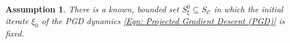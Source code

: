\documentclass[letterpaper, 10 pt, conference]{ieeeconf}
\newcommand{\?}{\stackrel{?}{=}}
\newcommand{\obj}{J}
\newcommand{\param}{\theta}
\newcommand{\paramSet}{\Theta}
\newcommand{\var}{\xi}
\newcommand{\varOpt}{\var^\star}
\newcommand{\varOptSet}{S_\var^\star}
\newcommand{\smoothnessConstant}{L}
\newcommand{\ratePGD}{\alpha}
\newcommand{\ratePGDMin}{c_\ratePGD}
\newcommand{\ratePGDMax}{C_\ratePGD}
\newcommand{\constraintSet}{{S_{\mathcal{C}}}}
\newcommand{\varInitialSet}{S_\var^0}
\newtheorem{assumption}{Assumption}
\newcommand{\frank}[1]{{\textcolor[rgb]{0,0,1}{\textsf{[Frank: {#1}]}}}}
\newcommand{\antoine}[1]{{\textcolor[rgb]{1,0,0}{\textsf{[Antoine: {#1}]}}}}
\begin{document}


\begin{assumption}
\label{Assump: PGD Dynamics, Initial Iterate}
There is a known, bounded set $\varInitialSet \subseteq \constraintSet$ in which the initial iterate $\var_0$ of the PGD dynamics \eqref{Eqn: Projected Gradient Descent (PGD)} is fixed.
\end{assumption}
\end{document}

